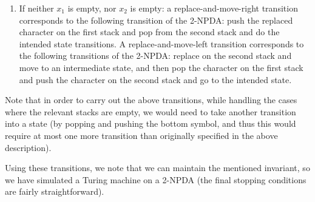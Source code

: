 \begin{soln}
\begin{enumerate}
        \item If neither $x_1$ is empty, nor $x_2$ is empty: a replace-and-move-right transition corresponds to the following transition of the 2-NPDA: push the replaced character on the
            first stack and pop from the second stack and do the intended state transitions. A replace-and-move-left transition corresponds to the following transitions of the 2-NPDA: replace on the
            second stack and move to an intermediate state, and then pop the character on the first stack and push the character on the second stack and go to the intended state.
    \end{enumerate}
    Note that in order to carry out the above transitions, while handling the cases where the relevant stacks are empty, we would need to take another transition into a state (by popping and pushing
    the bottom symbol, and thus this would require at most one more transition than originally specified in the above description).

    Using these transitions, we note that we can maintain the mentioned invariant, so we have simulated a Turing machine on a 2-NPDA (the final stopping conditions are fairly
    straightforward).

\end{soln}

